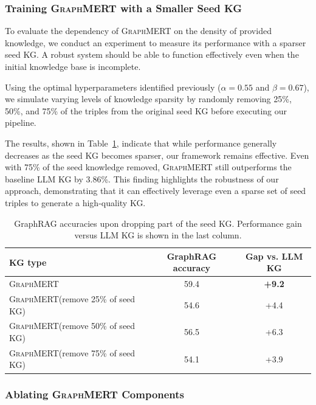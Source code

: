 \documentclass[10pt]{article}
\newcommand{\ours}{\textsc{GraphMERT}\xspace}
\begin{document}
\subsubsection{Training \ours with a Smaller Seed KG}
To evaluate the dependency of \ours on the density of provided knowledge, we conduct an experiment to measure its performance with a sparser seed KG. A robust system should be able to function effectively even when the initial knowledge base is incomplete.

Using the optimal hyperparameters identified previously ($\alpha=0.55$ and $\beta=0.67$), we simulate varying levels of knowledge sparsity by randomly removing 25\%, 50\%, and 75\% of the triples from the original seed KG before executing our pipeline.

The results, shown in Table~\ref{tab:seed_size}, indicate that while performance generally decreases as the seed KG becomes sparser, our framework remains effective. Even with 75\% of the seed knowledge removed, \ours still outperforms the baseline LLM KG by 3.86\%. This finding highlights the robustness of our approach, demonstrating that it can effectively leverage even a sparse set of seed triples to generate a high-quality KG.

\begin{table}[t!]
  \centering
  \caption{GraphRAG accuracies upon dropping part of the seed KG. Performance gain versus LLM KG is shown in the last column.}
  \label{tab:seed_size}
  \begingroup
  \small
  \setlength{\tabcolsep}{6pt}
  \begin{tabular}{l c c}
    \toprule
    \rowcolor{gray!30}
    \textbf{KG type} & \textbf{GraphRAG accuracy} & \textbf{Gap vs. LLM KG} \\
    \midrule
    \ours & 59.4 & \textbf{+9.2}\\   
    \ours (remove 25\% of seed KG) & 54.6 & +4.4\\
    \ours (remove 50\% of seed KG) & 56.5 & +6.3\\   
    \ours (remove 75\% of seed KG) & 54.1 & +3.9 \\  
    \bottomrule
  \end{tabular}
  \endgroup
\end{table}

\subsubsection{Ablating \ours Components}
\label{subsubsec:abalting_components}
\end{document}
